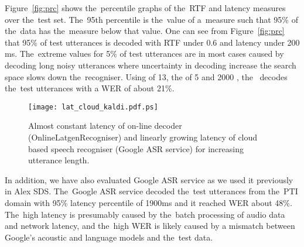 
Figure~\ref{fig:prc} shows the~percentile graphs of the~RTF and latency measures over the~test set.
The~95th percentile is the~value of a~measure such that 95\% of the~data has the~measure below that value.
One can see from Figure~\ref{fig:prc} that 95\% of test utterances is decoded with RTF under 0.6 and latency under 200 ms.
The~extreme values for 5\% of test utterances are in most cases caused by decoding long noisy utterances where uncertainty in decoding increase the search space slows down the~recogniser.
Using  of 13, the  of 5 and 2000  , the~ decodes the~test utterances with a WER of about 21\%.


\begin{figure*}[t]
    \begin{center}
    \texttt{[image: lat\_cloud\_kaldi.pdf.ps]}
    \caption{Almost constant latency of on-line decoder (OnlineLatgenRecogniser) and linearly growing latency of cloud based speech recogniser (Google ASR service) for increasing utterance length.}
    \label{fig:wer} 
    \end{center}
\end{figure*}

In addition, we have also evaluated Google ASR service as we used it previously in Alex \ac{SDS}.
The~Google ASR service decoded the~test utterances from the~PTI domain with 95\% latency percentile of 1900ms and it reached WER about 48\%.
The~high latency is presumably caused by the~batch processing of audio data and network latency, and the~high WER is likely caused by a mismatch between Google's acoustic and language models and the~test data.

